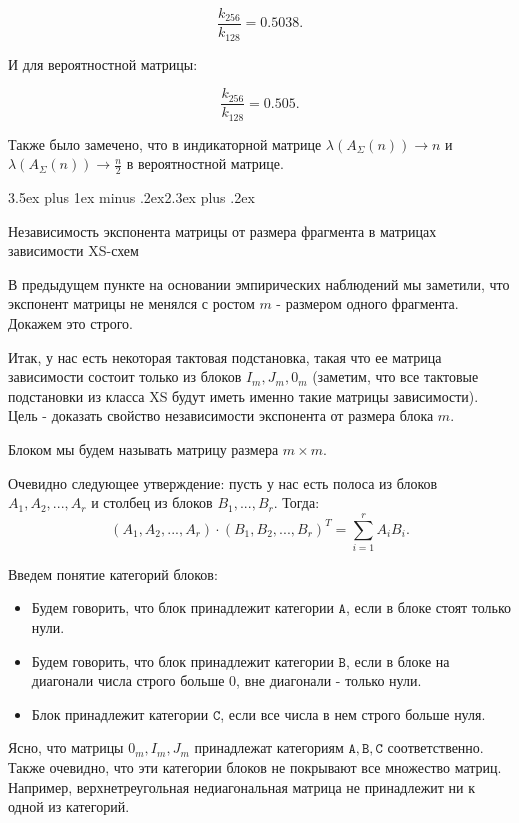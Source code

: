 \documentclass[a4paper,12pt]{report}
\makeatletter
\theoremstyle{plain} %
\theoremstyle{definition}
\theoremstyle{remark}
\renewcommand{\section}{\@startsection{section}{1}{18pt}%
{3.5ex plus 1ex minus .2ex}{2.3ex plus .2ex}%
{\normalfont\Large\bfseries\raggedright}}%
\makeatother
\begin{document}
\begin{large}
$$\frac{k_{256}}{k_{128}} = 0.5038.$$

И для вероятностной матрицы:

$$\frac{k_{256}}{k_{128}} = 0.505.$$

Также было замечено, что в индикаторной матрице $\lambda(A_{\Sigma}(n)) \rightarrow n$ и $\lambda(A_{\Sigma}(n)) \rightarrow \frac{n}{2}$ в вероятностной матрице.

\section{Независимость экспонента матрицы от размера фрагмента в матрицах зависимости XS-схем}

В предыдущем пункте на основании эмпирических наблюдений мы заметили, что экспонент матрицы не менялся с ростом $m$ - размером одного фрагмента. Докажем это строго.

Итак, у нас есть некоторая тактовая подстановка, такая что ее матрица зависимости состоит только из блоков $I_m, J_m, 0_m$ (заметим, что все тактовые подстановки из класса XS будут иметь именно такие матрицы зависимости). Цель - доказать свойство независимости экспонента от размера блока $m$.

Блоком мы будем называть матрицу размера $m \times m$.

Очевидно следующее утверждение: пусть у нас есть полоса из блоков $A_1, A_2, ..., A_r$ и столбец из блоков $B_1, ..., B_r$. Тогда:
$$(A_1, A_2, ..., A_r) \cdot (B_1, B_2, ..., B_r)^T = \sum_{i=1}^r A_iB_i.$$

Введем понятие категорий блоков:

\begin{itemize}
\item Будем говорить, что блок принадлежит категории $\texttt{A}$, если в блоке стоят только нули.

\item Будем говорить, что блок принадлежит категории $\texttt{B}$, если в блоке на диагонали числа строго больше 0, вне диагонали - только нули.

\item Блок принадлежит категории $\texttt{C}$, если все числа в нем строго больше нуля.
\end{itemize}
Ясно, что матрицы $0_m, I_m, J_m$ принадлежат категориям $\texttt{A}, \texttt{B}, \texttt{C}$ соответственно. Также очевидно, что эти категории блоков не покрывают все множество матриц. Например, верхнетреугольная недиагональная матрица не принадлежит ни к одной из категорий.


\end{large}
\end{document}
